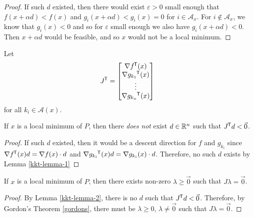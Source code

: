 \begin{proof}
    If such $d$ existed, then there would exist $\varepsilon > 0$ small enough that $f(x + \alpha d) < f(x)$ and $g_i(x + \alpha d) < g_i(x) = 0$ for $i \in \mathcal{A}_x$. For $i \notin \mathcal{A}_x$, we know that $g_i(x) < 0$ and so for $\varepsilon$ small enough we also have $g_i(x + \alpha d) < 0$. Then $x + \alpha d$ would be feasible, and so $x$ would not be a local minimum.
\end{proof}

\begin{lemma}\label{kkt-lemma-2}
    Let
    \begin{align*}
        {J}^{\mkern-1.5mu\mathsf{T}} = \begin{bmatrix}
            \nabla {f}^{\mkern-1.5mu\mathsf{T}}(x) \\ \nabla {g_{k_1}}^{\mkern-1.5mu\mathsf{T}}(x) \\ \vdots \\ \nabla {g_{k_n}}^{\mkern-1.5mu\mathsf{T}}(x)
        \end{bmatrix}
    \end{align*}
    for all $k_i \in \mathcal{A}(x)$.

    If $x$ is a local minimum of $P$, then there \emph{does not} exist $d \in \mathbb{R}^n$ such that ${J}^{\mkern-1.5mu\mathsf{T}}d < \vec{0}$.
\end{lemma}

\begin{proof}
    If such $d$ existed, then it would be a descent direction for $f$ and $g_{k_i}$ since $\nabla {f}^{\mkern-1.5mu\mathsf{T}}(x)d = \nabla f(x) \cdot d$ and $\nabla {g_{k_i}}^{\mkern-1.5mu\mathsf{T}}(x)d = \nabla g_{k_i}(x) \cdot d$. Therefore, no such $d$ exists by Lemma \ref{kkt-lemma-1}
\end{proof}

\begin{lemma}\label{kkt-lemma-3}
    If $x$ is a local minimum of $P$, then there exists non-zero $\lambda \geq \vec{0}$ such that $J\lambda = \vec{0}$.
\end{lemma}

\begin{proof}
    By Lemma \ref{kkt-lemma-2}, there is no $d$ such that ${J}^{\mkern-1.5mu\mathsf{T}}d < \vec{0}$. Therefore, by Gordon's Theorem \ref{gordons}, there must be $\lambda \geq 0$, $\lambda \neq \vec{0}$ such that $J\lambda = \vec{0}$.
\end{proof}

